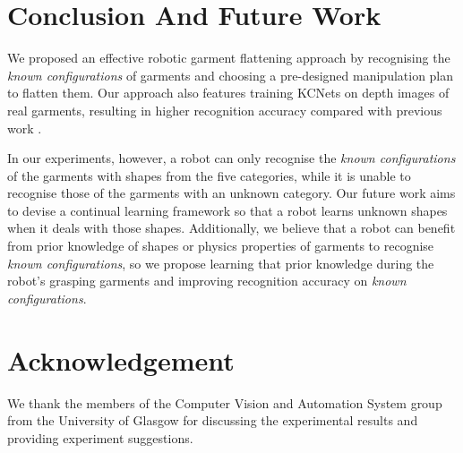 \documentclass[conference]{IEEEtran}
\begin{document}


\section{Conclusion And Future Work \label{sec:conclusion_and_future_work}}
We proposed an effective robotic garment flattening approach by recognising the \textit{known configurations} of garments and choosing a pre-designed manipulation plan to flatten them. Our approach also features training KCNets on depth images of real garments, resulting in higher recognition accuracy compared with previous work \cite{8255664}.

In our experiments, however, a robot can only recognise the \textit{known configurations} of the garments with shapes from the five categories, while it is unable to recognise those of the garments with an unknown category. Our future work aims to devise a continual learning framework so that a robot learns unknown shapes when it deals with those shapes. Additionally, we believe that a robot can benefit from prior knowledge of shapes \cite{duan2022garnet} or physics properties \cite{duan2022physnet} of garments to recognise \textit{known configurations}, so we propose learning that prior knowledge during the robot’s grasping garments and improving recognition accuracy on \textit{known configurations}.

\section{Acknowledgement \label{sec:acknowledgement}}
We thank the members of the Computer Vision and Automation System group from the University of Glasgow for discussing the experimental results and providing experiment suggestions.



\end{document}
